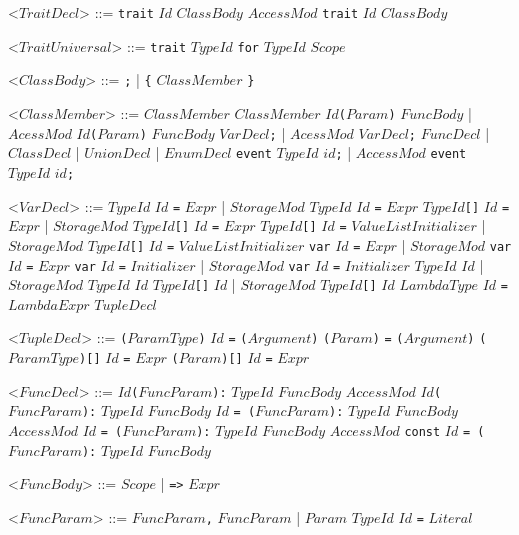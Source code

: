 \documentclass{article}
\newcommand{\gtext}[1]{<$#1$>}
\newcommand{\glit}[1]{\texttt{#1}}
\begin{document}
\begin{grammar}
	\gtext{TraitDecl} ::= \glit{trait} $Id$ $ClassBody$
	\alt $AccessMod$ \glit{trait} $Id$ $ClassBody$
	
	\gtext{TraitUniversal} ::= \glit{trait} $TypeId$ \glit{for} $TypeId$ $Scope$
	
	\gtext{ClassBody} ::= \glit{;} | \glit{\{} $ClassMember$ \glit{\}}
	
	\gtext{ClassMember} ::= $ClassMember$ $ClassMember$
	\alt $Id$\glit{(}$Param$\glit{)} $FuncBody$ | $AcessMod$ $Id$\glit{(}$Param$\glit{)} $FuncBody$ %
	\alt $VarDecl$\glit{;} | $AcessMod$ $VarDecl$\glit{;}
	\alt $FuncDecl$ | $ClassDecl$ | $UnionDecl$ | $EnumDecl$
	\alt \glit{event} $TypeId$ $id$\glit{;} | $AccessMod$ \glit{event} $TypeId$ $id$\glit{;}
	
	\newpage	
	
	\gtext{VarDecl} ::= $TypeId$ $Id$ \glit{=} $Expr$ | $StorageMod$ $TypeId$ $Id$ \glit{=} $Expr$
	\alt $TypeId$\glit{[]} $Id$ \glit{=} $Expr$ | $StorageMod$ $TypeId$\glit{[]} $Id$ \glit{=} $Expr$
	\alt $TypeId$\glit{[]} $Id$ \glit{=} $ValueListInitializer$ | $StorageMod$ $TypeId$\glit{[]} $Id$ \glit{=} $ValueListInitializer$
	\alt \glit{var} $Id$ \glit{=} $Expr$ | $StorageMod$ \glit{var} $Id$ \glit{=} $Expr$
	\alt \glit{var} $Id$ \glit{=} $Initializer$ | $StorageMod$ \glit{var} $Id$ \glit{=} $Initializer$
	\alt $TypeId$ $Id$ | $StorageMod$ $TypeId$ $Id$
	\alt $TypeId$\glit{[]} $Id$ | $StorageMod$ $TypeId$\glit{[]} $Id$
	\alt $LambdaType$ $Id$ \glit{=} $LambdaExpr$
	\alt $TupleDecl$

	\gtext{TupleDecl} ::= \glit{(}$ParamType$\glit{)} $Id$ \glit{=} \glit{(}$Argument$\glit{)}
	\alt \glit{(}$Param$\glit{)} \glit{=} \glit{(}$Argument$\glit{)}
	\alt \glit{(}$ParamType$\glit{)[]} $Id$ \glit{=} $Expr$
	\alt \glit{(}$Param$\glit{)[]} $Id$ \glit{=} $Expr$

	\gtext{FuncDecl} ::=  $Id$\glit{(}$FuncParam$\glit{):} $TypeId$ $FuncBody$ %
	\alt $AccessMod$ $Id$\glit{(}$FuncParam$\glit{):} $TypeId$ $FuncBody$ %
	\alt $Id$ \glit{= (}$FuncParam$\glit{):} $TypeId$ $FuncBody$  %
	\alt $AccessMod$ $Id$ \glit{= (}$FuncParam$\glit{):} $TypeId$ $FuncBody$  %
	\alt $AccessMod$ \glit{const} $Id$ \glit{= (}$FuncParam$\glit{):} $TypeId$ $FuncBody$  %
	
	\gtext{FuncBody} ::= $Scope$ | \glit{=>} $Expr$
	
	\gtext{FuncParam} ::= $FuncParam$\glit{,} $FuncParam$ | $Param$
	\alt $TypeId$ $Id$ \glit{=} $Literal$	
	

\end{grammar}
\end{document}
